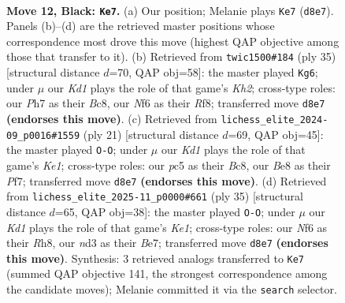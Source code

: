 \documentclass[11pt]{article}
\begin{document}
\begin{figure}[p]
\label{fig:thought-m21}
\end{figure}

\clearpage

\begin{figure}[p]\centering
\begin{subfigure}{0.46\textwidth}\centering
\resizebox{\linewidth}{!}{%
\newchessgame
\chessboard[
  setfen={rn1kbbr1/1p3ppp/p3pn2/2P5/P1B5/3NPP2/1P4PP/RNB2RK1 b - - 0 12},
  showmover=false,
  pgfstyle=straightmove, color=movearrow, markmove={d8-e7}
]}
\caption{}
\end{subfigure}\hfill
\begin{subfigure}{0.46\textwidth}\centering
\resizebox{\linewidth}{!}{%
\newchessgame
\chessboard[
  setfen={r1b2r2/1pp2ppk/p1n5/6p1/PbBp4/1N1P4/1PP1RPPP/R1B3K1 b - - 3 18},
  showmover=false,
  pgfstyle=straightmove, color=movearrow, markmove={h7-g6}
]}
\caption{}
\end{subfigure}
\\[4pt]
\begin{subfigure}{0.46\textwidth}\centering
\resizebox{\linewidth}{!}{%
\newchessgame
\chessboard[
  setfen={r1b1k2r/5ppp/p1n1pn2/1pb5/8/1PN1PN2/P3BPPP/R1BR2K1 b kq - 1 11},
  showmover=false,
  pgfstyle=straightmove, color=movearrow, markmove={e8-g8}
]}
\caption{}
\end{subfigure}\hfill
\begin{subfigure}{0.46\textwidth}\centering
\resizebox{\linewidth}{!}{%
\newchessgame
\chessboard[
  setfen={4k2r/1r2bppp/p1n1pn2/1p1p4/3P1B2/1B5P/PPP1NPP1/1K1RR3 b k - 5 18},
  showmover=false,
  pgfstyle=straightmove, color=movearrow, markmove={e8-g8}
]}
\caption{}
\end{subfigure}
\caption{\textbf{Move 12, Black: \texttt{Ke7}.} (a) Our position; Melanie plays \texttt{Ke7} (\texttt{d8e7}). Panels (b)--(d) are the retrieved master positions whose correspondence most drove this move (highest QAP objective among those that transfer to it). (b) Retrieved from \texttt{twic1500\#184} (ply 35) [structural distance $d$=70, QAP obj=58]: the master played \texttt{Kg6}; under $\mu$ our \emph{Kd1} plays the role of that game's \emph{Kh2}; cross-type roles: our \emph{P}h7 as their \emph{B}c8, our \emph{N}f6 as their \emph{R}f8; transferred move \texttt{d8e7} \textbf{(endorses this move)}. (c) Retrieved from \texttt{lichess\_elite\_2024-09\_p0016\#1559} (ply 21) [structural distance $d$=69, QAP obj=45]: the master played \texttt{O-O}; under $\mu$ our \emph{Kd1} plays the role of that game's \emph{Ke1}; cross-type roles: our \emph{p}c5 as their \emph{B}c8, our \emph{B}e8 as their \emph{P}f7; transferred move \texttt{d8e7} \textbf{(endorses this move)}. (d) Retrieved from \texttt{lichess\_elite\_2025-11\_p0000\#661} (ply 35) [structural distance $d$=65, QAP obj=38]: the master played \texttt{O-O}; under $\mu$ our \emph{Kd1} plays the role of that game's \emph{Ke1}; cross-type roles: our \emph{N}f6 as their \emph{R}h8, our \emph{n}d3 as their \emph{B}e7; transferred move \texttt{d8e7} \textbf{(endorses this move)}. Synthesis: 3 retrieved analogs transferred to \texttt{Ke7} (summed QAP objective 141, the strongest correspondence among the candidate moves); Melanie committed it via the \texttt{search} selector.}

\end{figure}
\end{document}
